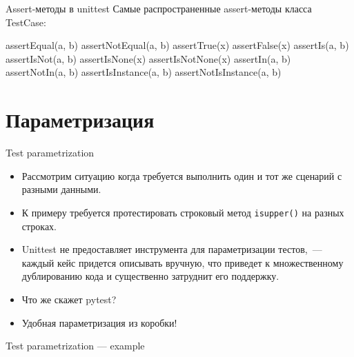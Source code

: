\documentclass{beamer}
\begin{document}
\begin{frame}[fragile]{Assert-методы в unittest}
    Самые распространенные assert-методы класса TestCase:
    \begin{pycode}
        assertEqual(a, b)
        assertNotEqual(a, b)
        assertTrue(x)
        assertFalse(x)
        assertIs(a, b)
        assertIsNot(a, b)
        assertIsNone(x)
        assertIsNotNone(x)
        assertIn(a, b)
        assertNotIn(a, b)
        assertIsInstance(a, b)
        assertNotIsInstance(a, b)
    \end{pycode}
\end{frame}

\section{Параметризация}
\begin{frame}[fragile]{Test parametrization}
    \begin{itemize}
    \item Рассмотрим ситуацию когда требуется выполнить один и тот же сценарий с разными данными.
    \pause \item К примеру требуется протестировать строковый метод \verb|isupper()| на разных строках.
    \pause \item Unittest не предоставляет инструмента для параметризации тестов,~--- каждый кейс придется описывать вручную, что приведет к множественному дублированию кода и существенно затруднит его поддержку.
    \pause \item Что же скажет pytest?
    \pause \item Удобная параметризация из коробки!
    \end{itemize}
\end{frame}

\begin{frame}[fragile]{Test parametrization --- example}
\end{frame}
\end{document}
